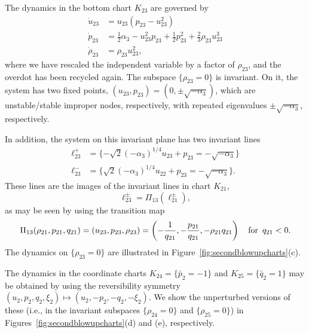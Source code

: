 \documentclass[11pt]{article}
\numberwithin{equation}{section}
\begin{document}
The dynamics in the bottom chart $K_{23}$ are governed by
\begin{equation}\label{eq:chartK23}
\begin{split}
    \dot{u}_{23} &= u_{23} (p_{23} - u_{23}^2)\\
    \dot{p}_{23} &= \tfrac12 \alpha_3 - u_{23}^2 p_{23} + \tfrac{1}{2} p_{23}^2 + \tfrac23 \rho_{23} u_{23}^3 \\
    \dot{\rho}_{23} &= \rho_{23} u_{23}^2,
\end{split}
\end{equation}
where we have rescaled the independent variable by a factor of $\rho_{23}$, and the overdot has been recycled again.
The subspace $\{ \rho_{23} = 0 \}$ is invariant.
On it, the system has two fixed points,
$(u_{23},p_{23})=(0, \pm \sqrt{-\alpha_3})$, which are unstable/stable improper nodes, respectively, with repeated eigenvalues $\pm \sqrt{-\alpha_3}$, respectively.

In addition, the system on this invariant plane has two invariant lines
\begin{equation}
\begin{split} 
    \ell_{23}^+ &= \{ -\sqrt{2}(-\alpha_3)^{1/4} u_{23} + p_{23} = -\sqrt{-\alpha_3} \} \\
    \ell_{23}^- &= \{ \sqrt{2}(-\alpha_3)^{1/4} u_{22} + p_{23} = - \sqrt{-\alpha_3} \}.
\end{split}
\end{equation}
These lines are the images of the invariant lines in chart $K_{21}$,
\begin{equation*}
    \ell_{23}^\pm = \Pi_{13}(\ell_{21}^\pm),
\end{equation*}
as may be seen by using the transition map 
\begin{equation}\label{eq:Pi13}
\Pi_{13}(\rho_{21},p_{21},q_{21}) = (u_{23},p_{23},\rho_{23}) 
= \left(
-\frac{1}{q_{21}}, -\frac{p_{21}}{q_{21}}, -\rho_{21}q_{21}
\right) \quad {\rm for} \, \,\, q_{21}<0.
\end{equation}
The dynamics on $\{ \rho_{23}=0 \}$ are illustrated in Figure~\ref{fig:secondblowupcharts}(c).

The dynamics in the coordinate charts $K_{24}=\{ \bar{p}_2=-1 \}$ and $K_{25}=\{ \bar{q}_2=1 \}$ may be obtained by using the reversibility symmetry $(u_2,p_2,q_2,\xi_2) \mapsto (u_2,-p_2,-q_2,-\xi_2)$. We show the unperturbed versions of these (i.e., in the invariant subspaces $\{\rho_{24}=0\}$ and $\{ \rho_{25} = 0 \}$) in Figures~\ref{fig:secondblowupcharts}(d) and (e), respectively.
\end{document}
